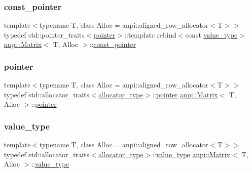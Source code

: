 \subsubsection{\texorpdfstring{const\+\_\+pointer}{const\_pointer}}
{\footnotesize\ttfamily template$<$typename T, class Alloc = anpi\+::aligned\+\_\+row\+\_\+allocator$<$\+T$>$$>$ \\
typedef std\+::pointer\+\_\+traits$<$\hyperlink{classanpi_1_1Matrix_a6d2754ddec71081f6e1c0e4c320e8f8e}{pointer}$>$\+::template rebind$<$const \hyperlink{classanpi_1_1Matrix_ad755076524c16fc494a392b0a66065cb}{value\+\_\+type}$>$ \hyperlink{classanpi_1_1Matrix}{anpi\+::\+Matrix}$<$ T, Alloc $>$\+::\hyperlink{classanpi_1_1Matrix_ac6d45526407ea4455424debdc4f21b91}{const\+\_\+pointer}}

\mbox{\label{classanpi_1_1Matrix_a6d2754ddec71081f6e1c0e4c320e8f8e}} 
\subsubsection{\texorpdfstring{pointer}{pointer}}
{\footnotesize\ttfamily template$<$typename T, class Alloc = anpi\+::aligned\+\_\+row\+\_\+allocator$<$\+T$>$$>$ \\
typedef std\+::allocator\+\_\+traits$<$\hyperlink{classanpi_1_1Matrix_a3574b7528e3ddfb2f7cdf446be8286c1}{allocator\+\_\+type}$>$\+::\hyperlink{classanpi_1_1Matrix_a6d2754ddec71081f6e1c0e4c320e8f8e}{pointer} \hyperlink{classanpi_1_1Matrix}{anpi\+::\+Matrix}$<$ T, Alloc $>$\+::\hyperlink{classanpi_1_1Matrix_a6d2754ddec71081f6e1c0e4c320e8f8e}{pointer}}

\mbox{\label{classanpi_1_1Matrix_ad755076524c16fc494a392b0a66065cb}} 
\subsubsection{\texorpdfstring{value\+\_\+type}{value\_type}}
{\footnotesize\ttfamily template$<$typename T, class Alloc = anpi\+::aligned\+\_\+row\+\_\+allocator$<$\+T$>$$>$ \\
typedef std\+::allocator\+\_\+traits$<$\hyperlink{classanpi_1_1Matrix_a3574b7528e3ddfb2f7cdf446be8286c1}{allocator\+\_\+type}$>$\+::\hyperlink{classanpi_1_1Matrix_ad755076524c16fc494a392b0a66065cb}{value\+\_\+type} \hyperlink{classanpi_1_1Matrix}{anpi\+::\+Matrix}$<$ T, Alloc $>$\+::\hyperlink{classanpi_1_1Matrix_ad755076524c16fc494a392b0a66065cb}{value\+\_\+type}}



